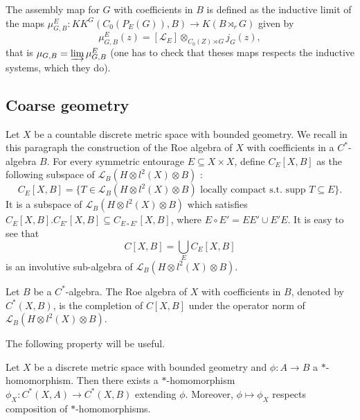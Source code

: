 \begin{definition}\label{projection}
The assembly map for $G$ with coefficients in $B$ is defined as the inductive limit of the maps $\mu_{G,B}^{E} : KK^G(C_0(P_E(G)),B)\rightarrow K(B\rtimes_r G)$ given by
\[\mu_{G,B}^{E} (z)=[\mathcal L_E]\otimes_{C_0(Z)\rtimes G} j_G(z),\]
that is $\mu_{G,B} = \varinjlim \mu_{G,B}^{E}$ (one has to check that theses maps respects the inductive systems, which they do).\\
\end{definition}

\subsection{Coarse geometry}

Let $X$ be a countable discrete metric space with bounded geometry. We recall in this paragraph the construction of the Roe algebra of $X$ with coefficients in a $C^*$-algebra $B$. For every symmetric entourage $E\subseteq X\times X$, define $C_E[X,B]$ as the following subspace of $\mathcal L_B(H\otimes l^2(X)\otimes B)$ :
\[C_E[X,B] = \{T\in \mathcal L_B(H\otimes l^2(X)\otimes B) \text{ locally compact  s.t. supp }T\subseteq E \}.\]
It is a subspace of $\mathcal L_B(H\otimes l^2(X)\otimes B)$ which satisfies $C_E[X,B].C_{E'}[X,B]\subseteq C_{E\circ E'}[X,B]$, where $E\circ E' = EE'\cup E'E$. It is easy to see that 
\[C[X,B] = \bigcup_{E} C_E[X,B]\] 
is an involutive sub-algebra of $\mathcal L_B(H\otimes l^2(X)\otimes B)$.

\begin{definition}
Let $B$ be a $C^*$-algebra. The Roe algebra of $X$ with coefficients in $B$, denoted by $C^*(X,B)$, is the completion of $C[X,B]$ under the operator norm of $\mathcal L_B(H\otimes l^2(X)\otimes B)$. 
\end{definition} 

The following property will be useful.

\begin{thm}\label{Xfunctor}
Let $X$ be a discrete metric space with bounded geometry and $\phi : A\rightarrow B$ a $*$-homomorphism. Then there exists a $*$-homomorphism $\phi_X : C^*(X,A)\rightarrow C^*(X,B)$ extending $\phi$. Moreover, $\phi\mapsto \phi_X$ respects composition of $*$-homomorphisms.
\end{thm}



